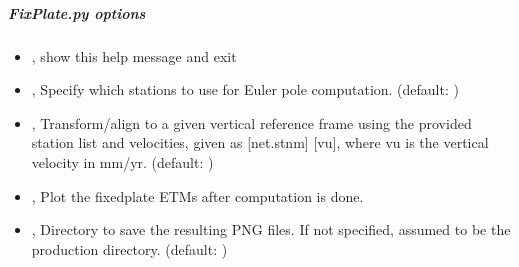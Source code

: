 \documentclass[letterpaper,10pt,english]{sphinxmanual}
\begin{document}
\subparagraph{FixPlate.py options}
\label{\detokenize{pgamit.com:FixPlate.py-options}}\begin{itemize}
\item {} 
\sphinxAtStartPar
{\hyperref[\detokenize{pgamit.com:FixPlate.py--h}]{}}, {\hyperref[\detokenize{pgamit.com:FixPlate.py---help}]{}} \sphinxhyphen{} show this help message and exit

\item {} 
\sphinxAtStartPar
{\hyperref[\detokenize{pgamit.com:FixPlate.py--include}]{}} , {\hyperref[\detokenize{pgamit.com:FixPlate.py---include_stations}]{}}  \sphinxhyphen{} Specify which stations to use for Euler pole computation. (default: )

\item {} 
\sphinxAtStartPar
{\hyperref[\detokenize{pgamit.com:FixPlate.py--vref}]{}} , {\hyperref[\detokenize{pgamit.com:FixPlate.py---vertical_ref}]{}}  \sphinxhyphen{} Transform/align to a given vertical reference frame using the provided station list and velocities, given as {[}net.stnm{]} {[}vu{]}, where vu is the vertical velocity in mm/yr. (default: \sphinxcode{\sphinxupquote{{[}{]}}})

\item {} 
\sphinxAtStartPar
{\hyperref[\detokenize{pgamit.com:FixPlate.py--plot}]{}}, {\hyperref[\detokenize{pgamit.com:FixPlate.py---plot_etms}]{}} \sphinxhyphen{} Plot the fixed\sphinxhyphen{}plate ETMs after computation is done.

\item {} 
\sphinxAtStartPar
{\hyperref[\detokenize{pgamit.com:FixPlate.py--dir}]{}} , {\hyperref[\detokenize{pgamit.com:FixPlate.py---directory}]{}}  \sphinxhyphen{} Directory to save the resulting PNG files. If not specified, assumed to be the production directory. (default: )


\end{itemize}
\end{document}

